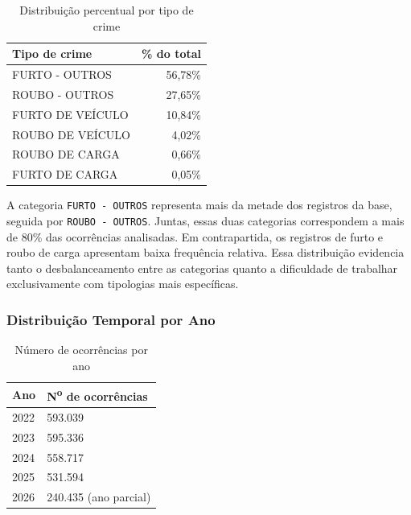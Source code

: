 \documentclass[12pt]{article}
\begin{document}
\begin{table}[h!]
    \centering
    \begin{tabular}{|l|r|}
        \hline
        \textbf{Tipo de crime} & \textbf{\% do total} \\
        \hline
        FURTO - OUTROS       & 56,78\% \\
        \hline
        ROUBO - OUTROS       & 27,65\% \\
        \hline
        FURTO DE VEÍCULO     & 10,84\% \\
        \hline
        ROUBO DE VEÍCULO     & 4,02\%  \\
        \hline
        ROUBO DE CARGA       & 0,66\%  \\
        \hline
        FURTO DE CARGA       & 0,05\%  \\
        \hline
    \end{tabular}
    \caption{Distribuição percentual por tipo de crime}
    \label{tab:crime-percentual}
\end{table}

A categoria \texttt{FURTO - OUTROS} representa mais da metade dos registros da base, seguida por \texttt{ROUBO - OUTROS}. Juntas, essas duas categorias correspondem a mais de 80\% das ocorrências analisadas. Em contrapartida, os registros de furto e roubo de carga apresentam baixa frequência relativa. Essa distribuição evidencia tanto o desbalanceamento entre as categorias quanto a dificuldade de trabalhar exclusivamente com tipologias mais específicas.

\subsubsection{Distribuição Temporal por Ano}

\begin{table}[h!]
    \centering
    \begin{tabular}{|l|l|}
        \hline
        \textbf{Ano} & \textbf{N\textsuperscript{o} de ocorrências} \\
        \hline
        2022 & 593.039 \\
        \hline
        2023 & 595.336 \\
        \hline
        2024 & 558.717 \\
        \hline
        2025 & 531.594 \\
        \hline
        2026 & 240.435 (ano parcial) \\
        \hline
    \end{tabular}
    \caption{Número de ocorrências por ano}
    \label{tab:ocorrencias-ano}
\end{table}
\end{document}
